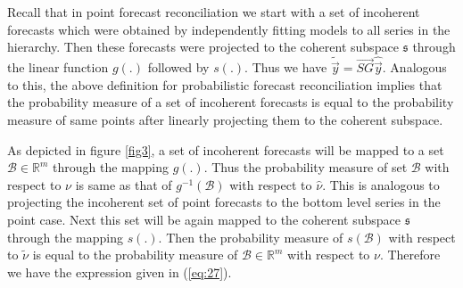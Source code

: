 \documentclass[graybox]{svmult}
\begin{document}
Recall that in point forecast reconciliation we start with a set of incoherent forecasts which were obtained by independently fitting models to all series in the hierarchy. Then these forecasts were projected to the coherent subspace $\mathfrak{s}$ through the linear function $g(.)$ followed by $s(.)$. Thus we have $\tilde{\vec{y}} = \vec{SG}\hat{\vec{y}}$. Analogous to this, the above definition for probabilistic forecast reconciliation implies that the probability measure of a set of incoherent forecasts is equal to the probability measure of same points after linearly projecting them to the coherent subspace.  

As depicted in figure \ref{fig3}, a set of incoherent forecasts will be mapped to a set $\mathcal{B} \in \mathbb{R}^m$ through the mapping $g(.)$. Thus the probability measure of set $\mathcal{B}$ with respect to $\nu$ is same as that of $g^{-1}(\mathcal{B})$ with respect to $\hat{\nu}$. This is analogous to projecting the incoherent set of point forecasts to the bottom level series in the point case. Next this set will be again mapped to the coherent subspace $\mathfrak{s}$ through the mapping $s(.)$. Then the probability measure of $s(\mathcal{B})$ with respect to $\tilde{\nu}$ is equal to the probability measure of $\mathcal{B} \in \mathbb{R}^m$ with respect to $\nu$. Therefore we have the expression given in (\ref{eq:27}).  
\end{document}
